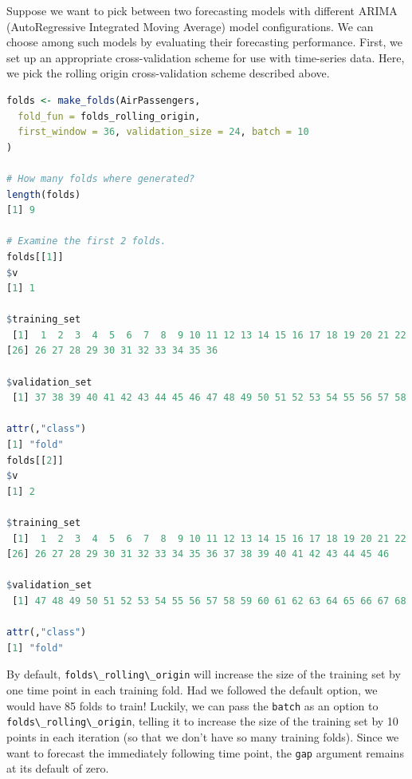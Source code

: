 \documentclass[
  12pt, krantz2,
]{krantz}
\newcommand{\passthrough}[1]{#1}
\newcommand{\1}{\mathbbm{1}}
\theoremstyle{definition}
\theoremstyle{definition}
\theoremstyle{definition}
\theoremstyle{definition}
\theoremstyle{remark}
\begin{document}
Suppose we want to pick between two forecasting models with different ARIMA
(AutoRegressive Integrated Moving Average) model configurations. We can choose
among such models by evaluating their forecasting performance. First, we set up
an appropriate cross-validation scheme for use with time-series data. Here, we
pick the rolling origin cross-validation scheme described above.

\begin{lstlisting}[language=R]
folds <- make_folds(AirPassengers,
  fold_fun = folds_rolling_origin,
  first_window = 36, validation_size = 24, batch = 10
)

# How many folds where generated?
length(folds)
[1] 9

# Examine the first 2 folds.
folds[[1]]
$v
[1] 1

$training_set
 [1]  1  2  3  4  5  6  7  8  9 10 11 12 13 14 15 16 17 18 19 20 21 22 23 24 25
[26] 26 27 28 29 30 31 32 33 34 35 36

$validation_set
 [1] 37 38 39 40 41 42 43 44 45 46 47 48 49 50 51 52 53 54 55 56 57 58 59 60

attr(,"class")
[1] "fold"
folds[[2]]
$v
[1] 2

$training_set
 [1]  1  2  3  4  5  6  7  8  9 10 11 12 13 14 15 16 17 18 19 20 21 22 23 24 25
[26] 26 27 28 29 30 31 32 33 34 35 36 37 38 39 40 41 42 43 44 45 46

$validation_set
 [1] 47 48 49 50 51 52 53 54 55 56 57 58 59 60 61 62 63 64 65 66 67 68 69 70

attr(,"class")
[1] "fold"
\end{lstlisting}

By default, \passthrough{\lstinline!folds\_rolling\_origin!} will increase the size of the training set by
one time point in each training fold. Had we followed the default option, we
would have 85 folds to train! Luckily, we can pass the \passthrough{\lstinline!batch!} as an option to
\passthrough{\lstinline!folds\_rolling\_origin!}, telling it to increase the size of the training set by
10 points in each iteration (so that we don't have so many training folds).
Since we want to forecast the immediately following time point, the \passthrough{\lstinline!gap!}
argument remains at its default of zero.
\end{document}
